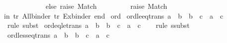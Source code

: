 \begin{isabellebody}
\ \ \ \ \ \ \ \ \ \ \ \ else\ raise\ Match{\isacharparenright}{\kern0pt}\isanewline
\ \ \ \ \ \ {\isacharbar}{\kern0pt}\ {\isacharunderscore}{\kern0pt}\ {\isacharequal}{\kern0pt}{\isachargreater}{\kern0pt}\ raise\ Match{\isacharparenright}{\kern0pt}{\isacharparenright}{\kern0pt}{\isacharsemicolon}{\kern0pt}\isanewline
in\ {\isacharbrackleft}{\kern0pt}tr{\isacharprime}{\kern0pt}\ All{\isacharunderscore}{\kern0pt}binder{\isacharcomma}{\kern0pt}\ tr{\isacharprime}{\kern0pt}\ Ex{\isacharunderscore}{\kern0pt}binder{\isacharbrackright}{\kern0pt}\ end\isanewline
{\isacartoucheclose}%
\endisatagML
{\isafoldML}%
%
\isadelimML
%
\endisadelimML
%
\isadelimdocument
%
\endisadelimdocument
%
\isatagdocument
%
\isamarkuptrue%
%
\endisatagdocument
{\isafolddocument}%
%
\isadelimdocument
%
\endisadelimdocument
{}\isamarkupfalse%
\ ord\isanewline
{}\isanewline
\isanewline
{}\isamarkupfalse%
\ ord{\isacharunderscore}{\kern0pt}le{\isacharunderscore}{\kern0pt}eq{\isacharunderscore}{\kern0pt}trans{\isacharcolon}{\kern0pt}\ {\isachardoublequoteopen}a\ {\isasymle}\ b\ {\isasymLongrightarrow}\ b\ {\isacharequal}{\kern0pt}\ c\ {\isasymLongrightarrow}\ a\ {\isasymle}\ c{\isachardoublequoteclose}\isanewline
%
\isadelimproof
\ \ %
\endisadelimproof
%
\isatagproof
{}\isamarkupfalse%
\ {\isacharparenleft}{\kern0pt}rule\ subst{\isacharparenright}{\kern0pt}%
\endisatagproof
{\isafoldproof}%
%
\isadelimproof
\isanewline
%
\endisadelimproof
\isanewline
{}\isamarkupfalse%
\ ord{\isacharunderscore}{\kern0pt}eq{\isacharunderscore}{\kern0pt}le{\isacharunderscore}{\kern0pt}trans{\isacharcolon}{\kern0pt}\ {\isachardoublequoteopen}a\ {\isacharequal}{\kern0pt}\ b\ {\isasymLongrightarrow}\ b\ {\isasymle}\ c\ {\isasymLongrightarrow}\ a\ {\isasymle}\ c{\isachardoublequoteclose}\isanewline
%
\isadelimproof
\ \ %
\endisadelimproof
%
\isatagproof
{}\isamarkupfalse%
\ {\isacharparenleft}{\kern0pt}rule\ ssubst{\isacharparenright}{\kern0pt}%
\endisatagproof
{\isafoldproof}%
%
\isadelimproof
\isanewline
%
\endisadelimproof
\isanewline
{}\isamarkupfalse%
\ ord{\isacharunderscore}{\kern0pt}less{\isacharunderscore}{\kern0pt}eq{\isacharunderscore}{\kern0pt}trans{\isacharcolon}{\kern0pt}\ {\isachardoublequoteopen}a\ {\isacharless}{\kern0pt}\ b\ {\isasymLongrightarrow}\ b\ {\isacharequal}{\kern0pt}\ c\ {\isasymLongrightarrow}\ a\ {\isacharless}{\kern0pt}\ c{\isachardoublequoteclose}\isanewline
%
\isadelimproof
\ \ %
\endisadelimproof
%
\isatagproof
{}\isamarkupfalse%

\end{isabellebody}
